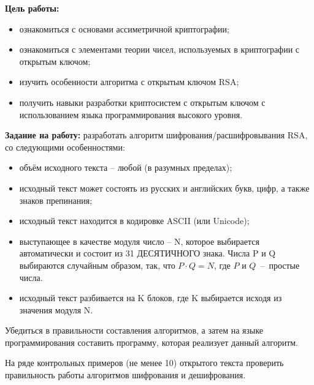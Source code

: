 \documentclass[utf8x, 14pt, bold, times]{G7-32} %
\begin{document}
\frontmatter %



\maketitle

\newpage
\tableofcontents

\nobreakingbeforechapters

\newpage
\Introduction

\textbf{Цель работы:}
\begin{itemize}
\item ознакомиться с основами ассиметричной криптографии;
\item ознакомиться с элементами теории чисел, используемых в криптографии с
      открытым ключом;
\item изучить особенности алгоритма с открытым ключом RSA;
\item получить навыки разработки криптосистем с открытым ключом с
      использованием языка программирования высокого уровня.
\end{itemize}

\textbf{Задание на работу:}
разработать алгоритм шифрования/расшифровывания RSA, со следующими особенностями:
\begin{itemize}
\item объём исходного текста – любой (в разумных пределах);
\item исходный текст может состоять из русских и английских букв, цифр, а
      также знаков препинания;
\item исходный текст находится в кодировке ASCII (или Unicode);
\item выступающее в качестве модуля число – N, которое выбирается автоматически и
      состоит из 31 ДЕСЯТИЧНОГО знака. Числа P и Q выбираются случайным образом,
      так, что $P \cdot Q = N$, где $P$ и $Q$~–~простые числа.
\item исходный текст разбивается на K блоков, где K выбирается исходя из
      значения модуля N.
\end{itemize}

Убедиться в правильности составления алгоритмов, а затем на языке
программирования составить программу, которая реализует данный алгоритм.

На ряде контрольных примеров (не менее 10) открытого текста проверить
правильность работы алгоритмов шифрования и дешифрования.
\end{document}
